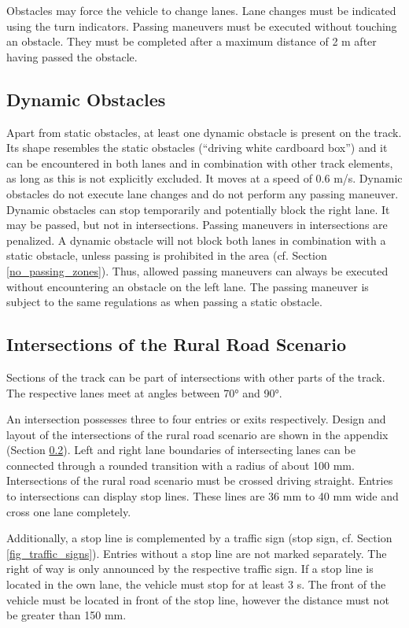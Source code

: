 \documentclass[a4paper]{report}
\begin{document}
{Obstacles may force the vehicle to change lanes. Lane changes must be indicated using the turn indicators. Passing maneuvers must be executed without touching an obstacle. They must be completed after a maximum distance of 2 m after having passed the obstacle. 

\subsection{Dynamic Obstacles}

Apart from static obstacles, at least one dynamic obstacle is present on the track. Its shape resembles the static obstacles (“driving white cardboard box”) and it can be encountered in both lanes and in combination with other track elements, as long as this is not explicitly excluded. It moves at a speed of 0.6 m/s. Dynamic obstacles do not execute lane changes and do not perform any passing maneuver. Dynamic obstacles can stop temporarily and potentially block the right lane. It may be passed, but not in intersections. Passing maneuvers in intersections are penalized. A dynamic obstacle will not block both lanes in combination with a static obstacle, unless passing is prohibited in the area (cf. Section \ref{no_passing_zones}). Thus, allowed passing maneuvers can always be executed without encountering an obstacle on the left lane. The passing maneuver is subject to the same regulations as when passing a static obstacle. 

\subsection{Intersections of the Rural Road Scenario}
\label{intersection_rural}

Sections of the track can be part of intersections with other parts of the track. The respective lanes meet at angles between 70° and 90°. 

An intersection possesses three to four entries or exits respectively. Design and layout of the intersections of the rural road scenario are shown in the appendix (Section \ref{intersection_rural}). Left and right lane boundaries of intersecting lanes can be connected through a rounded transition with a radius of about 100 mm. Intersections of the rural road scenario must be crossed driving straight. Entries to intersections can display stop lines. These lines are 36 mm to 40 mm wide and cross one lane completely.

Additionally, a stop line is complemented by a traffic sign (stop sign, cf. Section \ref{fig_traffic_signs}). Entries without a stop line are not marked separately. The right of way is only announced by the respective traffic sign. If a stop line is located in the own lane, the vehicle must stop for at least 3 s. The front of the vehicle must be located in front of the stop line, however the distance must not be greater than 150 mm. 

}
\end{document}
